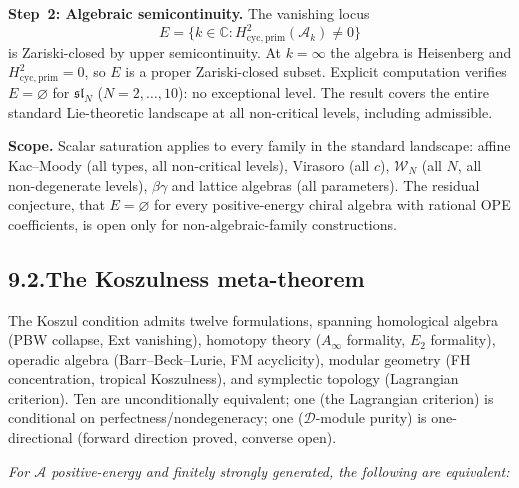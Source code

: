 \documentclass[11pt,reqno]{amsart}
\theoremstyle{definition}
\theoremstyle{remark}
\providecommand{\cA}{\mathcal{A}}
\numberwithin{equation}{section}
\begin{document}
\medskip
\noindent\textbf{Step~2: Algebraic semicontinuity.}\enspace
The vanishing locus
\[
E=\{k\in\mathbb C:H^2_{\mathrm{cyc,prim}}(\cA_k)\neq 0\}
\]
is Zariski-closed by upper semicontinuity. At $k=\infty$ the algebra
is Heisenberg and $H^2_{\mathrm{cyc,prim}}=0$, so $E$ is a proper
Zariski-closed subset. Explicit computation verifies $E=\varnothing$
for $\mathfrak{sl}_N$ ($N=2,\ldots,10$): no exceptional level. The
result covers the entire standard Lie-theoretic landscape at all
non-critical levels, including admissible.

\medskip
\noindent\textbf{Scope.}\enspace
Scalar saturation applies to every family in the standard landscape:
affine Kac--Moody (all types, all non-critical levels), Virasoro (all
$c$), $\mathcal W_N$ (all $N$, all non-degenerate levels),
$\beta\gamma$ and lattice algebras (all parameters). The residual
conjecture, that $E=\varnothing$ for every positive-energy chiral
algebra with rational OPE coefficients, is open only for
non-algebraic-family constructions.

\subsection*{9.2.\enspace The Koszulness meta-theorem}

The Koszul condition admits twelve formulations, spanning homological
algebra (PBW collapse, Ext vanishing), homotopy theory ($A_\infty$
formality, $E_2$ formality), operadic algebra
(Barr--Beck--Lurie, FM acyclicity), modular geometry (FH
concentration, tropical Koszulness), and symplectic topology
(Lagrangian criterion). Ten are unconditionally equivalent; one (the
Lagrangian criterion) is conditional on perfectness/nondegeneracy;
one ($\mathcal D$-module purity) is one-directional (forward direction
proved, converse open).

\begin{center}
\emph{For $\cA$ positive-energy and finitely strongly generated, the
following are equivalent:}
\end{center}
\end{document}
